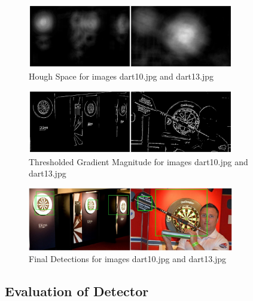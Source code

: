 \documentclass[conference]{IEEEtran}
\begin{document}
\begin{figure}[ht!]
	\centering
	\includegraphics[width=90mm]{img/Task3_Images/houghspace_dart.jpg}
	\caption{Hough Space for images dart10.jpg and dart13.jpg}
\end{figure}

\begin{figure}[ht!]
	\centering
	\includegraphics[width=90mm]{img/Task3_Images/threshold_dart.jpg}
	\caption{Thresholded Gradient Magnitude for images dart10.jpg and dart13.jpg}
\end{figure}

\begin{figure}[ht!]
	\centering
	\includegraphics[width=90mm]{img/Task3_Images/detected_dart.jpg}
	\caption{Final Detections for images dart10.jpg and dart13.jpg}
\end{figure}

\subsection{Evaluation of Detector}
\end{document}
